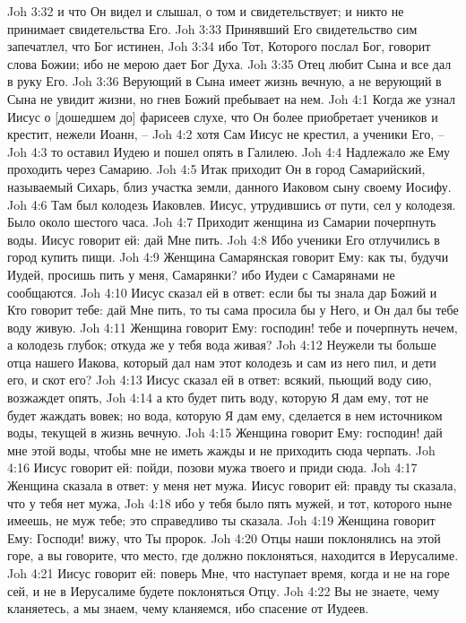 Joh 3:32  и что Он видел и слышал, о том и свидетельствует; и никто не принимает свидетельства Его.
Joh 3:33  Принявший Его свидетельство сим запечатлел, что Бог истинен,
Joh 3:34  ибо Тот, Которого послал Бог, говорит слова Божии; ибо не мерою дает Бог Духа.
Joh 3:35  Отец любит Сына и все дал в руку Его.
Joh 3:36  Верующий в Сына имеет жизнь вечную, а не верующий в Сына не увидит жизни, но гнев Божий пребывает на нем.
Joh 4:1  Когда же узнал Иисус о [дошедшем до] фарисеев слухе, что Он более приобретает учеников и крестит, нежели Иоанн, --
Joh 4:2  хотя Сам Иисус не крестил, а ученики Его, --
Joh 4:3  то оставил Иудею и пошел опять в Галилею.
Joh 4:4  Надлежало же Ему проходить через Самарию.
Joh 4:5  Итак приходит Он в город Самарийский, называемый Сихарь, близ участка земли, данного Иаковом сыну своему Иосифу.
Joh 4:6  Там был колодезь Иаковлев. Иисус, утрудившись от пути, сел у колодезя. Было около шестого часа.
Joh 4:7  Приходит женщина из Самарии почерпнуть воды. Иисус говорит ей: дай Мне пить.
Joh 4:8  Ибо ученики Его отлучились в город купить пищи.
Joh 4:9  Женщина Самарянская говорит Ему: как ты, будучи Иудей, просишь пить у меня, Самарянки? ибо Иудеи с Самарянами не сообщаются.
Joh 4:10  Иисус сказал ей в ответ: если бы ты знала дар Божий и Кто говорит тебе: дай Мне пить, то ты сама просила бы у Него, и Он дал бы тебе воду живую.
Joh 4:11  Женщина говорит Ему: господин! тебе и почерпнуть нечем, а колодезь глубок; откуда же у тебя вода живая?
Joh 4:12  Неужели ты больше отца нашего Иакова, который дал нам этот колодезь и сам из него пил, и дети его, и скот его?
Joh 4:13  Иисус сказал ей в ответ: всякий, пьющий воду сию, возжаждет опять,
Joh 4:14  а кто будет пить воду, которую Я дам ему, тот не будет жаждать вовек; но вода, которую Я дам ему, сделается в нем источником воды, текущей в жизнь вечную.
Joh 4:15  Женщина говорит Ему: господин! дай мне этой воды, чтобы мне не иметь жажды и не приходить сюда черпать.
Joh 4:16  Иисус говорит ей: пойди, позови мужа твоего и приди сюда.
Joh 4:17  Женщина сказала в ответ: у меня нет мужа. Иисус говорит ей: правду ты сказала, что у тебя нет мужа,
Joh 4:18  ибо у тебя было пять мужей, и тот, которого ныне имеешь, не муж тебе; это справедливо ты сказала.
Joh 4:19  Женщина говорит Ему: Господи! вижу, что Ты пророк.
Joh 4:20  Отцы наши поклонялись на этой горе, а вы говорите, что место, где должно поклоняться, находится в Иерусалиме.
Joh 4:21  Иисус говорит ей: поверь Мне, что наступает время, когда и не на горе сей, и не в Иерусалиме будете поклоняться Отцу.
Joh 4:22  Вы не знаете, чему кланяетесь, а мы знаем, чему кланяемся, ибо спасение от Иудеев.
